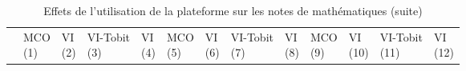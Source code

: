 \documentclass[
]{book}
\begin{document}
\begin{landscape}
\begin{ThreePartTable}
\begin{longtable}[t]{lllllllllllll}
\midrule
\endfirsthead
\caption[]{\label{tab:g20models}Effets de l'utilisation de la plateforme sur les notes de mathématiques (suite)}\\
\toprule
  & \makecell{MCO \\ (1) } & \makecell{VI \\ (2) } & \makecell{VI-Tobit \\ (3) } & \makecell{VI \\ (4) } & \makecell{MCO \\ (5) } & \makecell{VI \\ (6) } & \makecell{VI-Tobit \\ (7) } & \makecell{VI \\ (8) } & \makecell{MCO \\ (9) } & \makecell{VI \\ (10) } & \makecell{VI-Tobit \\ (11) } & \makecell{VI \\ (12) }\\
\midrule
\endhead


\end{longtable}
\end{ThreePartTable}
\end{landscape}
\end{document}
